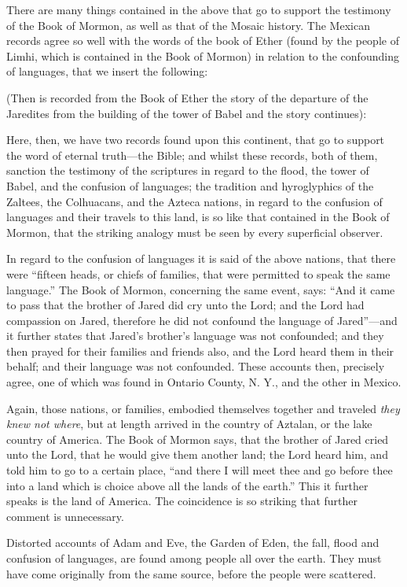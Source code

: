 There are many things contained in the above that go to support the testimony of the Book of
Mormon, as well as that of the Mosaic history. The Mexican records agree so well with the
words of the book of Ether (found by the people of Limhi, which is contained in the Book of
Mormon) in relation to the confounding of languages, that we insert the following:

(Then is recorded from the Book of Ether the story of the departure of the Jaredites from the
building of the tower of Babel and the story continues):

Here, then, we have two records found upon this continent, that go to support the word of
eternal truth—the Bible; and whilst these records, both of them, sanction the testimony of the
scriptures in regard to the flood, the tower of Babel, and the confusion of languages; the
tradition and hyroglyphics of the Zaltees, the Colhuacans, and the Azteca nations, in regard
to the confusion of languages and their travels to this land, is so like that contained in the
Book of Mormon, that the striking analogy must be seen by every superficial observer.

In regard to the confusion of languages it is said of the above nations, that there were ``fifteen
heads, or chiefs of families, that were permitted to speak the same language.'' The Book of
Mormon, concerning the same event, says: ``And it came to pass that the brother of Jared did
cry unto the Lord; and the Lord had compassion on Jared, therefore he did not confound the
language of Jared''—and it further states that Jared's brother's language was not confounded;
and they then prayed for their families and friends also, and the Lord heard them in their
behalf; and their language was not confounded. These accounts then, precisely agree, one of
which was found in Ontario County, N. Y., and the other in Mexico.

Again, those nations, or families, embodied themselves together and traveled \textit{they knew not
where}, but at length arrived in the country of Aztalan, or the lake country of America. The
Book of Mormon says, that the brother of Jared cried unto the Lord, that he would give them
another land; the Lord heard him, and told him to go to a certain place, ``and there I will meet
thee and go before thee into a land which is choice above all the lands of the earth.'' This it
further speaks is the land of America. The coincidence is so striking that further comment is
unnecessary.

Distorted accounts of Adam and Eve, the Garden of Eden, the fall, flood and confusion of
languages, are found among people all over the earth. They must have come originally from
the same source, before the people were scattered.

